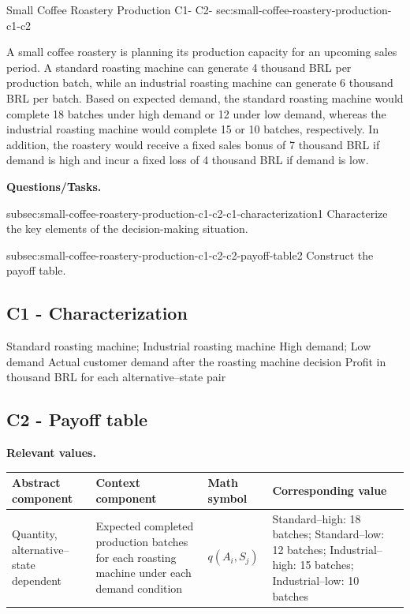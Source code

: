 	\sectionScored
	{Small Coffee Roastery Production}
	{C1- \hspace{2mm} C2-}
	{sec:small-coffee-roastery-production-c1-c2}
	{
		A small coffee roastery is planning its production capacity for an upcoming sales period. A standard roasting machine can generate 4 thousand BRL per production batch, while an industrial roasting machine can generate 6 thousand BRL per batch. Based on expected demand, the standard roasting machine would complete 18 batches under high demand or 12 under low demand, whereas the industrial roasting machine would complete 15 or 10 batches, respectively. In addition, the roastery would receive a fixed sales bonus of 7 thousand BRL if demand is high and incur a fixed loss of 4 thousand BRL if demand is low.
		
		\textbf{Questions/Tasks.}
		\begin{enumerate}
			\CriterionTask
			{subsec:small-coffee-roastery-production-c1-c2-c1-characterization}{1}
			{Characterize the key elements of the decision-making situation. }
			
			\CriterionTask
			{subsec:small-coffee-roastery-production-c1-c2-c2-payoff-table}{2}
			{Construct the payoff table. }
		\end{enumerate}
		
		\label{subsec:small-coffee-roastery-production-c1-c2-c1-characterization}
		\subsection*{C1 - Characterization }
		
		\DecisionElementsTable
		{Standard roasting machine; Industrial roasting machine}
		{High demand; Low demand}
		{Actual customer demand after the roasting machine decision}
		{Profit in thousand BRL for each alternative--state pair}
		
		\label{subsec:small-coffee-roastery-production-c1-c2-c2-payoff-table}
		\subsection*{C2 - Payoff table }
		
		\textbf{Relevant values.}
		
		\begin{center}
			\small
			\begin{tabularx}{\textwidth}{
					>{\raggedright\arraybackslash}X
					>{\raggedright\arraybackslash}X
					>{\centering\arraybackslash}p{}
					>{\raggedright\arraybackslash}X
				}
				\toprule
				Abstract component & Context component & Math symbol & Corresponding value \\
				\midrule
				Quantity, alternative--state dependent
				&
				Expected completed production batches for each roasting machine under each demand condition
				&
				$q(A_i,S_j)$
				&
				Standard--high: 18 batches; Standard--low: 12 batches; Industrial--high: 15 batches; Industrial--low: 10 batches
				\\
				

\end{tabularx}
\end{center}}
